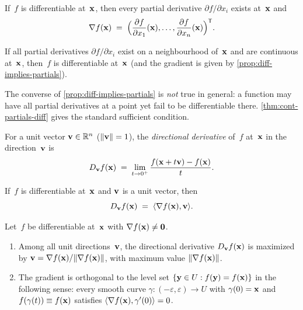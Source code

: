 \begin{proposition}
\label{prop:diff-implies-partials}
If~$f$ is differentiable at~$\mathbf{x}$, then every partial derivative
$\partial f / \partial x_i$ exists at~$\mathbf{x}$ and
\[
  \nabla f(\mathbf{x}) \;=\; \Bigl(\frac{\partial f}{\partial x_1}(\mathbf{x}), \dots, \frac{\partial f}{\partial x_n}(\mathbf{x})\Bigr)^{\mathsf{T}}.
\]
\end{proposition}

\begin{theorem}
\label{thm:cont-partials-diff}
If all partial derivatives $\partial f / \partial x_i$ exist on a
neighbourhood of~$\mathbf{x}$ and are continuous at~$\mathbf{x}$, then~$f$
is differentiable at~$\mathbf{x}$ (and the gradient is given by
\cref{prop:diff-implies-partials}).
\end{theorem}

The converse of \cref{prop:diff-implies-partials} is \emph{not}
true in general: a function may have all partial derivatives at a
point yet fail to be differentiable there. \cref{thm:cont-partials-diff}
gives the standard sufficient condition.

\begin{definition}
\label{def:directional-derivative}
For a unit vector $\mathbf{v} \in \mathbb{R}^n$ ($\|\mathbf{v}\| = 1$), the
\emph{directional derivative} of~$f$ at~$\mathbf{x}$ in the
direction~$\mathbf{v}$ is
\[
  D_{\mathbf{v}} f(\mathbf{x}) \;=\; \lim_{t \to 0^{+}} \frac{f(\mathbf{x} + t\mathbf{v}) - f(\mathbf{x})}{t}.
\]
\end{definition}

\begin{theorem}
\label{thm:directional-derivative-formula}
If~$f$ is differentiable at~$\mathbf{x}$ and $\mathbf{v}$ is a unit vector, then
\[
  D_{\mathbf{v}} f(\mathbf{x}) \;=\; \langle \nabla f(\mathbf{x}), \mathbf{v} \rangle.
\]
\end{theorem}

\begin{theorem}
\label{thm:gradient-geometry}
Let~$f$ be differentiable at~$\mathbf{x}$ with $\nabla f(\mathbf{x}) \neq \mathbf{0}$.
\begin{enumerate}[label=(\alph*)]
  \item Among all unit directions~$\mathbf{v}$, the directional
        derivative $D_{\mathbf{v}} f(\mathbf{x})$ is maximized by
        $\mathbf{v} = \nabla f(\mathbf{x}) / \|\nabla f(\mathbf{x})\|$, with
        maximum value $\|\nabla f(\mathbf{x})\|$.
  \item The gradient is orthogonal to the level set
        $\{\mathbf{y} \in U : f(\mathbf{y}) = f(\mathbf{x})\}$ in the
        following sense: every smooth curve $\gamma \colon (-\varepsilon, \varepsilon) \to U$
        with $\gamma(0) = \mathbf{x}$ and $f(\gamma(t)) \equiv f(\mathbf{x})$
        satisfies $\langle \nabla f(\mathbf{x}), \gamma'(0) \rangle = 0$.
\end{enumerate}
\end{theorem}

